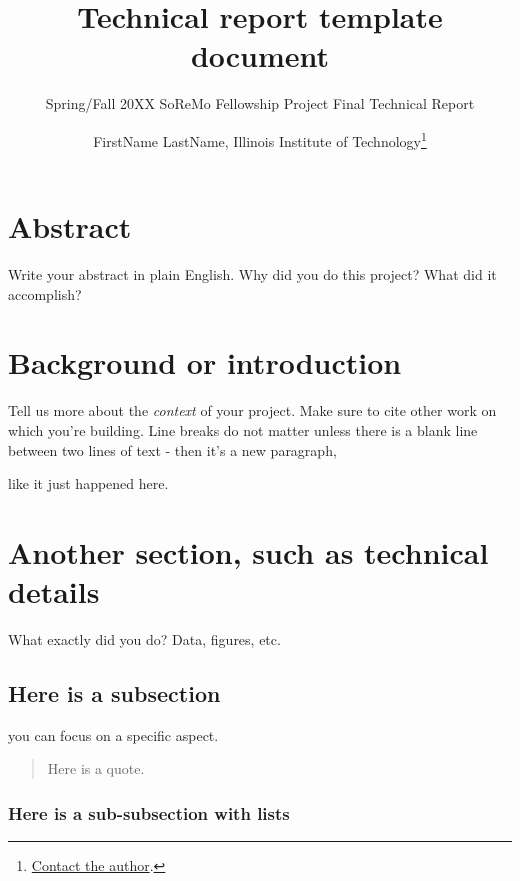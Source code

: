 \documentclass[
]{article}
\title{Technical report template document}
\subtitle{Spring/Fall 20XX SoReMo Fellowship Project Final Technical Report}
\author{FirstName LastName, Illinois Institute of Technology\footnote{\href{mailto:YOUREMAILHERE@hawk.iit.edu}{Contact
  the author}.}}
\date{}
\begin{document}
\maketitle

{
\hypersetup{linkcolor=}
\setcounter{tocdepth}{1}
\tableofcontents
}
\hypertarget{abstract}{%
\section{Abstract}\label{abstract}}

Write your abstract in plain English. Why did you do this project? What
did it accomplish?

\hypertarget{background-or-introduction}{%
\section{Background or introduction}\label{background-or-introduction}}

Tell us more about the \emph{context} of your project. Make sure to cite
other work on which you're building. Line breaks do not matter unless
there is a blank line between two lines of text - then it's a new
paragraph,

like it just happened here.

\hypertarget{another-section-such-as-technical-details}{%
\section{Another section, such as technical
details}\label{another-section-such-as-technical-details}}

What exactly did you do? Data, figures, etc.

\hypertarget{here-is-a-subsection}{%
\subsection{Here is a subsection}\label{here-is-a-subsection}}

you can focus on a specific aspect.

\begin{quote}
Here is a quote.
\end{quote}

\hypertarget{here-is-a-sub-subsection-with-lists}{%
\subsubsection{Here is a sub-subsection with
lists}\label{here-is-a-sub-subsection-with-lists}}
\end{document}
